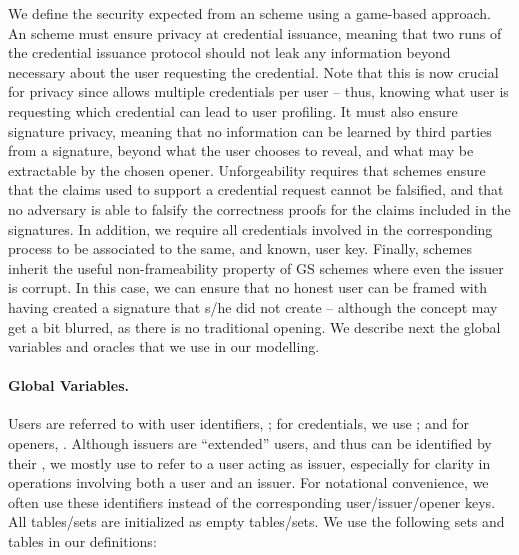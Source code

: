 We define the security expected from an \UAS scheme using a game-based approach.
An \UAS scheme must ensure privacy at credential issuance, meaning that two
runs of the credential issuance protocol should not leak any information beyond
necessary about the user requesting the credential. Note that this is now
crucial for privacy since \UAS allows multiple credentials per
user -- thus, knowing what user is requesting which credential can lead to user
profiling. It must also ensure signature privacy, meaning that no information
can be learned by third parties from a signature, beyond what the user chooses
to reveal, and what may be extractable by the chosen opener. Unforgeability
requires that \UAS schemes ensure that the claims used to support a credential
request cannot be falsified, and that no adversary is able to falsify the
correctness proofs for the claims included in the signatures. In addition, we
require all credentials involved in the corresponding process to be associated
to the same, and known, user key. Finally, \UAS schemes inherit the useful
non-frameability property of GS schemes where even the issuer is corrupt. In
this case, we can ensure that no honest user can be framed with having created a
signature that s/he did not create -- although the concept may get a bit
blurred, as there is no traditional opening.
%
We describe next the global variables and oracles that we use in our modelling.

\paragraph{Global Variables.} %
Users are referred to with user identifiers, \uid; for credentials, we use \cid;
and for openers, \oid. Although issuers are ``extended'' users, and thus can be
identified by their \uid, we mostly use \iid to refer to a user acting as
issuer, especially for clarity in operations involving both a user and an
issuer.
%
For notational convenience, we often use these identifiers instead of the
corresponding user/issuer/opener keys.
%
All tables/sets are initialized as empty tables/sets. We use the following sets
and tables in our definitions:

